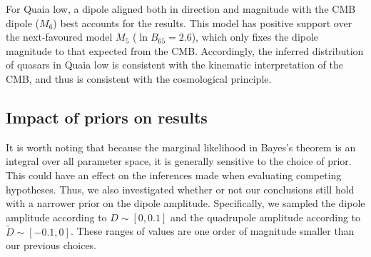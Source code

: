 \documentclass[fleqn,usenatbib]{mnras}
\begin{document}
        For Quaia low, a dipole aligned both in direction and magnitude with the CMB dipole ($M_6$) best accounts for the results.
        This model has positive support over the next-favoured model $M_5$ ($\ln B_{65} = 2.6$), which only fixes the dipole magnitude to that expected from the CMB.
        Accordingly, the inferred distribution of quasars in Quaia low is consistent with the kinematic interpretation of the CMB, and thus is consistent with the cosmological principle.
        

    \subsection{Impact of priors on results}
        It is worth noting that because the marginal likelihood in Bayes's theorem is an integral over all parameter space, it is generally sensitive to the choice of prior.
        This could have an effect on the inferences made when evaluating competing hypotheses.
        Thus, we also investigated whether or not our conclusions still hold with a narrower prior on the dipole amplitude.
        Specifically, we sampled the dipole amplitude according to $D \sim [0,0.1]$ and the quadrupole amplitude according to $\tilde{D} \sim [-0.1, 0]$.
        These ranges of values are one order of magnitude smaller than our previous choices.
\end{document}
